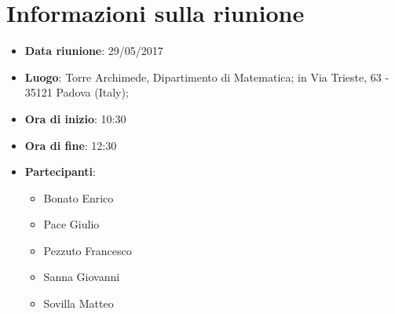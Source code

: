 \documentclass[../AnalisiDeiRequisiti.tex]{subfiles}
\begin{document}
	\section*{Informazioni sulla riunione}
		\begin{itemize}
			\item \textbf{Data riunione}: 29/05/2017
			\item \textbf{Luogo}: Torre Archimede, Dipartimento di Matematica; in Via Trieste, 63 - 35121 Padova (Italy);
			\item \textbf{Ora di inizio}: 10:30
			\item \textbf{Ora di fine}: 12:30
			\item \textbf{Partecipanti}:
				\begin{itemize}
					\item Bonato Enrico
					\item Pace Giulio
					\item Pezzuto Francesco
					\item Sanna Giovanni
					\item Sovilla Matteo
				\end{itemize}
		\end{itemize}
\end{document}
